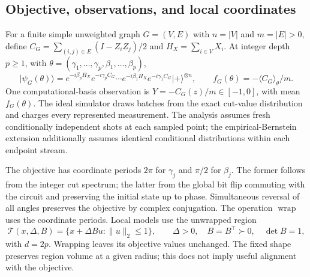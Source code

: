 \documentclass[11pt]{article}
\newcommand{\ket}[1]{\lvert #1\rangle}
\newcommand{\norm}[1]{\lVert #1\rVert}
\begin{document}
\subsection{Objective, observations, and local coordinates}
For a finite simple unweighted graph $G=(V,E)$ with $n=|V|$ and
$m=|E|>0$, define $C_G=\sum_{(i,j)\in E}(I-Z_iZ_j)/2$ and
$H_X=\sum_{i\in V}X_i$. At integer depth $p\ge1$, with
$\theta=(\gamma_1,\ldots,\gamma_p,\beta_1,\ldots,\beta_p)$,
\begin{equation}
 \ket{\psi_G(\theta)}=
 e^{-i\beta_pH_X}e^{-i\gamma_p C_G}\cdots
 e^{-i\beta_1H_X}e^{-i\gamma_1 C_G}\ket{+}^{\otimes n},
 \qquad f_G(\theta)=-\langle C_G\rangle_\theta/m.
 \label{eq:state}
\end{equation}
One computational-basis observation is $Y=-C_G(z)/m\in[-1,0]$,
with mean $f_G(\theta)$. The ideal simulator draws batches from the exact
cut-value distribution and charges every represented measurement.
The analysis assumes fresh conditionally independent shots at each sampled
point; the empirical-Bernstein extension additionally assumes identical
conditional distributions within each endpoint stream.

The objective has coordinate periods $2\pi$ for $\gamma_j$ and $\pi/2$
for $\beta_j$. The former follows from the integer cut spectrum; the latter
from the global bit flip commuting with the circuit and preserving the
initial state up to phase. Simultaneous reversal of all angles preserves
the objective by complex conjugation. The operation $\operatorname{wrap}$
uses the coordinate periods. Local models use the unwrapped region
\begin{equation}
 \mathcal T(x,\Delta,B)=\{x+\Delta Bu:\norm u_2\le1\},
 \qquad \Delta>0,\quad B=B^\top\succ0,\quad\det B=1,
 \label{eq:region}
\end{equation}
with $d=2p$. Wrapping leaves its objective values unchanged. The fixed shape
preserves region volume at a given radius; this does not imply useful
alignment with the objective.
\end{document}
